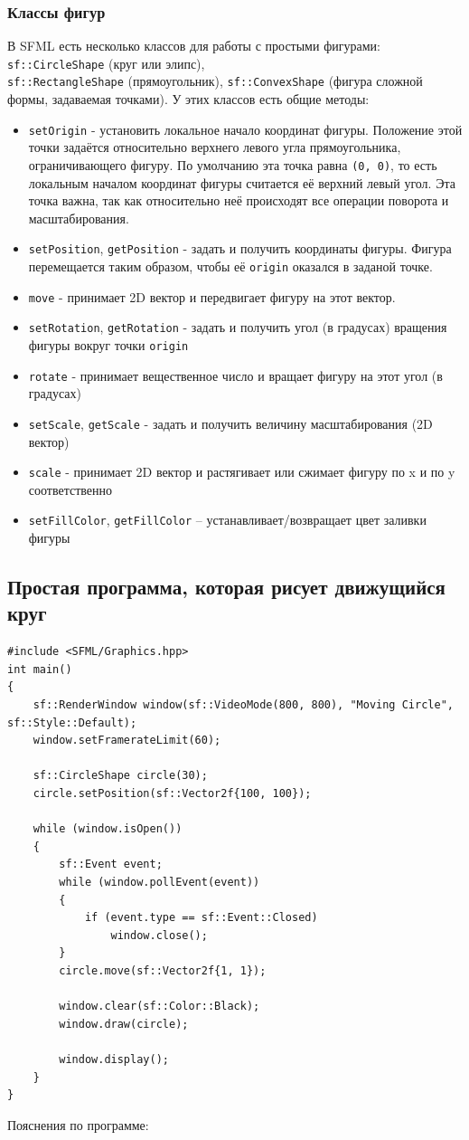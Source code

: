 \documentclass{article}
\begin{document}
\subsubsection*{Классы фигур}
В SFML есть несколько классов для работы с простыми фигурами: \texttt{sf::CircleShape} (круг или элипс),\\ \texttt{sf::RectangleShape} (прямоугольник), \texttt{sf::ConvexShape} (фигура сложной формы, задаваемая точками). У этих классов есть общие методы:
\begin{itemize}
\item \texttt{setOrigin} - установить локальное начало координат фигуры. Положение этой точки задаётся относительно верхнего левого угла прямоугольника, ограничивающего фигуру. По умолчанию эта точка равна \texttt{(0, 0)}, то есть локальным началом координат фигуры считается её верхний левый угол.  Эта точка важна, так как относительно неё происходят все операции поворота и масштабирования.
\item \texttt{setPosition}, \texttt{getPosition} - задать и получить координаты фигуры. Фигура перемещается таким образом, чтобы её \texttt{origin} оказался в заданой точке.
\item \texttt{move} - принимает 2D вектор и передвигает фигуру на этот вектор.
\item \texttt{setRotation}, \texttt{getRotation} - задать и получить угол (в градусах) вращения фигуры вокруг точки \texttt{origin}
\item \texttt{rotate} - принимает вещественное число и вращает фигуру на этот угол (в градусах)
\item \texttt{setScale}, \texttt{getScale} - задать и получить величину масштабирования (2D вектор)
\item \texttt{scale} - принимает  2D вектор и растягивает или сжимает фигуру по x и по y соответственно
\item \texttt{setFillColor}, \texttt{getFillColor} -- устанавливает/возвращает цвет заливки фигуры
\end{itemize}

\subsection*{Простая программа, которая рисует движущийся круг}

\begin{lstlisting}
#include <SFML/Graphics.hpp>
int main()
{
    sf::RenderWindow window(sf::VideoMode(800, 800), "Moving Circle", sf::Style::Default);
    window.setFramerateLimit(60);
    
    sf::CircleShape circle(30);
    circle.setPosition(sf::Vector2f{100, 100});

    while (window.isOpen())
    {
        sf::Event event;
        while (window.pollEvent(event)) 
        {
            if (event.type == sf::Event::Closed)
                window.close();
        }
        circle.move(sf::Vector2f{1, 1});

        window.clear(sf::Color::Black);
        window.draw(circle);

        window.display();
    }
}
\end{lstlisting}
Пояснения по программе:
\end{document}
